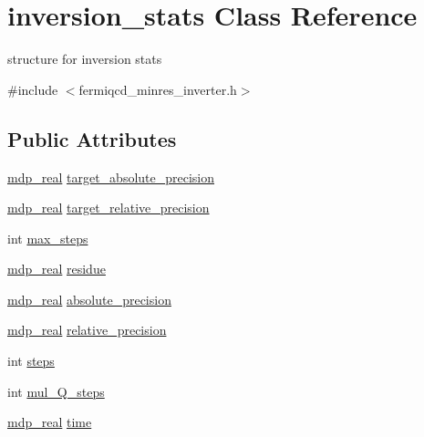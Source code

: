 \hypertarget{classinversion__stats}{}\section{inversion\+\_\+stats Class Reference}
\label{classinversion__stats}


structure for inversion stats  




{\ttfamily \#include $<$fermiqcd\+\_\+minres\+\_\+inverter.\+h$>$}

\subsection*{Public Attributes}
\begin{DoxyCompactItemize}
\item 
\hyperlink{mdp__global__vars_8h_a69d96b74c791e0bbdb888b3913a69450}{mdp\+\_\+real} \hyperlink{classinversion__stats_aa3e398f27da37c39f825b407829e8c15}{target\+\_\+absolute\+\_\+precision}
\item 
\hyperlink{mdp__global__vars_8h_a69d96b74c791e0bbdb888b3913a69450}{mdp\+\_\+real} \hyperlink{classinversion__stats_a57f0e5274f6057d41a9e386d2d3d213e}{target\+\_\+relative\+\_\+precision}
\item 
int \hyperlink{classinversion__stats_ad11085b60e91bb439a125457fc16c69a}{max\+\_\+steps}
\item 
\hyperlink{mdp__global__vars_8h_a69d96b74c791e0bbdb888b3913a69450}{mdp\+\_\+real} \hyperlink{classinversion__stats_a6463ea546805e548502803d09c7b74f0}{residue}
\item 
\hyperlink{mdp__global__vars_8h_a69d96b74c791e0bbdb888b3913a69450}{mdp\+\_\+real} \hyperlink{classinversion__stats_aba965f93a417bb48f9d01933cbacc46e}{absolute\+\_\+precision}
\item 
\hyperlink{mdp__global__vars_8h_a69d96b74c791e0bbdb888b3913a69450}{mdp\+\_\+real} \hyperlink{classinversion__stats_a3bbfed38efd2f5669aaee413676f0d4a}{relative\+\_\+precision}
\item 
int \hyperlink{classinversion__stats_aabd17c3bb1476dc06843ed171ea53253}{steps}
\item 
int \hyperlink{classinversion__stats_a392e51a8f0ced3098ce309018dfa932c}{mul\+\_\+\+Q\+\_\+steps}
\item 
\hyperlink{mdp__global__vars_8h_a69d96b74c791e0bbdb888b3913a69450}{mdp\+\_\+real} \hyperlink{classinversion__stats_a648a0c2aae15866e7331d0cd4d0736ff}{time}
\end{DoxyCompactItemize}


